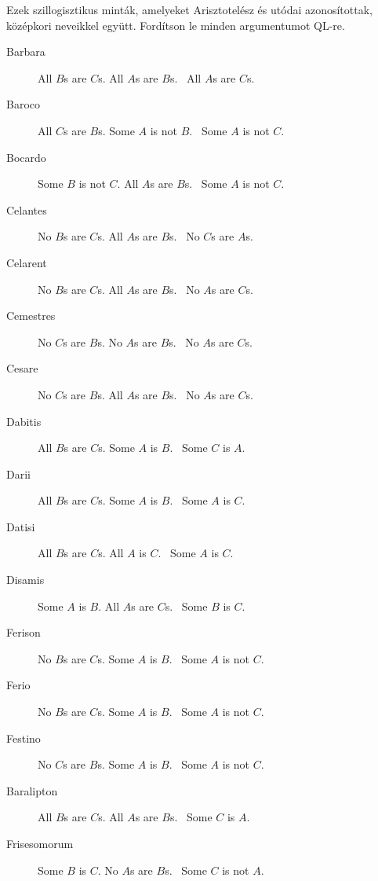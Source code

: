 Ezek szillogisztikus minták, amelyeket Arisztotelész és utódai azonosítottak, középkori neveikkel együtt. Fordítson le minden argumentumot QL-re.
\begin{description}
\item[Barbara] All $B$s are $C$s. All $A$s are $B$s.
	\therefore\  All $A$s are $C$s.
\item[Baroco] All $C$s are $B$s. Some $A$ is not $B$.
	\therefore\  Some $A$ is not $C$.
\item[Bocardo] Some $B$ is not $C$. All $A$s are $B$s.
	\therefore\  Some $A$ is not $C$.
\item[Celantes] No $B$s are $C$s. All $A$s are $B$s.
	\therefore\  No $C$s are $A$s.
\item[Celarent] No $B$s are $C$s. All $A$s are $B$s.
	\therefore\  No $A$s are $C$s.
\item[Cemestres] No $C$s are $B$s. No $A$s are $B$s.
	\therefore\  No $A$s are $C$s.
\item[Cesare] No $C$s are $B$s. All $A$s are $B$s.
	\therefore\  No $A$s are $C$s.
\item[Dabitis] All $B$s are $C$s. Some $A$ is $B$.
	\therefore\  Some $C$ is $A$.
\item[Darii] All $B$s are $C$s. Some $A$ is $B$.
	\therefore\  Some $A$ is $C$.
\item[Datisi] All $B$s are $C$s. All $A$ is $C$.
	\therefore\  Some $A$ is $C$.
\item[Disamis] Some $A$ is $B$. All $A$s are $C$s.
	\therefore\  Some $B$ is $C$.
\item[Ferison] No $B$s are $C$s. Some $A$ is $B$.
	\therefore\  Some $A$ is not $C$.
\item[Ferio] No $B$s are $C$s. Some $A$ is $B$.
	\therefore\  Some $A$ is not $C$.
\item[Festino] No $C$s are $B$s. Some $A$ is $B$.
	\therefore\  Some $A$ is not $C$.
\item[Baralipton] All $B$s are $C$s. All $A$s are $B$s.
	\therefore\  Some $C$ is $A$.
\item[Frisesomorum] Some $B$ is $C$. No $A$s are $B$s.
	\therefore\  Some $C$ is not $A$.
\end{description}
